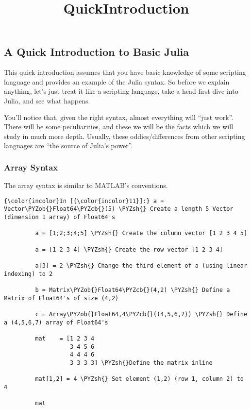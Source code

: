 \documentclass[11pt]{article}
\title{QuickIntroduction}
\def\PYZob{\char`\{}
\def\PYZcb{\char`\}}
\def\PYZsh{\char`\#}
\begin{document}
    
    
    \maketitle
    
    

    
    \subsection{A Quick Introduction to Basic
Julia}\label{a-quick-introduction-to-basic-julia}

This quick introduction assumes that you have basic knowledge of some
scripting language and provides an example of the Julia syntax. So
before we explain anything, let's just treat it like a scripting
language, take a head-first dive into Julia, and see what happens.

You'll notice that, given the right syntax, almost everything will
``just work''. There will be some peculiarities, and these we will be
the facts which we will study in much more depth. Usually, these
oddies/differences from other scripting languages are ``the source of
Julia's power''.

    \subsubsection{Array Syntax}\label{array-syntax}

The array syntax is similar to MATLAB's conventions.

    \begin{Verbatim}[commandchars=\\\{\}]
{\color{incolor}In [{\color{incolor}11}]:} a = Vector\PYZob{}Float64\PYZcb{}(5) \PYZsh{} Create a length 5 Vector (dimension 1 array) of Float64's
         
         a = [1;2;3;4;5] \PYZsh{} Create the column vector [1 2 3 4 5]
         
         a = [1 2 3 4] \PYZsh{} Create the row vector [1 2 3 4]
         
         a[3] = 2 \PYZsh{} Change the third element of a (using linear indexing) to 2
         
         b = Matrix\PYZob{}Float64\PYZcb{}(4,2) \PYZsh{} Define a Matrix of Float64's of size (4,2)
         
         c = Array\PYZob{}Float64,4\PYZcb{}((4,5,6,7)) \PYZsh{} Define a (4,5,6,7) array of Float64's 
         
         mat    = [1 2 3 4
                   3 4 5 6
                   4 4 4 6
                   3 3 3 3] \PYZsh{}Define the matrix inline 
         
         mat[1,2] = 4 \PYZsh{} Set element (1,2) (row 1, column 2) to 4
         
         mat
\end{Verbatim}
\end{document}
